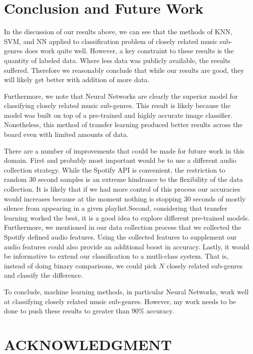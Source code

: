 \documentclass[letterpaper, 12 pt, conference]{ieeeconf}  %
\begin{document}
\section{Conclusion and Future Work}

In the discussion of our results above, we can see that the methods of KNN, SVM, and NN applied to classification problem of closely related music sub-genres does work quite well. However, a key constraint to these results is the quantity of labeled data. Where less data was publicly available, the results suffered. Therefore we reasonably conclude that while our results are good, they will likely get better with addition of more data.   

Furthermore, we note that Neural Networks are clearly the superior model for classifying closely related music sub-genres. This result is likely because the model was built on top of a pre-trained and highly accurate image classifier. Nonetheless, this method of transfer learning produced better results across the board even with limited amounts of data. 

There are a number of improvements that could be made for future work in this domain. First and probably most important would be to use a different audio collection strategy. While the Spotify API is convenient, the restriction to random 30 second samples is an extreme hindrance to the flexibility of the data collection. It is likely that if we had more control of this process our accuracies would increases because at the moment nothing is stopping 30 seconds of mostly silence from appearing in a given playlist.Second, considering that transfer learning worked the best, it is a good idea to explore different pre-trained models. Furthermore, we mentioned in our data collection process that we collected the Spotify defined audio features. Using the collected features to supplement our audio features could also provide an additional boost in accuracy. Lastly, it would be informative to extend our classification to a mutli-class system. That is, instead of doing binary comparisons, we could pick $N$ closely related sub-genres and classify the difference. 

To conclude, machine learning methods, in particular Neural Networks, work well at classifying closely related music sub-genres. However, my work needs to be done to push these results to greater than 90\% accuracy. 



\section*{ACKNOWLEDGMENT}
\end{document}
